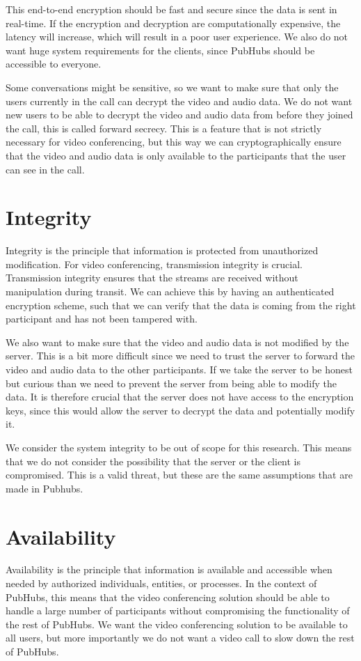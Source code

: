 \documentclass{report}
\begin{document}
This end-to-end encryption should be fast and secure since the data is sent in real-time. If the encryption and
decryption are computationally expensive, the latency will increase, which will result in a poor user experience. We
also do not want huge system requirements for the clients, since PubHubs should be accessible to everyone.

Some conversations might be sensitive, so we want to make sure that only the users currently in the call can
decrypt the video and audio data. We do not want new users to be able to decrypt the video and audio data from
before they joined the call, this is called forward secrecy. This is a feature that is not strictly necessary for
video conferencing, but this way we can cryptographically ensure that the video and audio data is only available to
the participants that the user can see in the call.

\section{Integrity}
Integrity is the principle that information is protected from unauthorized modification. For video conferencing, transmission integrity
is crucial. Transmission integrity ensures that the streams are received without manipulation during transit.
We can achieve this by having an authenticated encryption scheme, such that we can verify that the data is coming from
the right participant and has not been tampered with.

We also want to make sure that the video and audio data is not modified by the server. This is a bit more difficult
since we need to trust the server to forward the video and audio data to the other participants. If we take the server
to be honest but curious than we need to prevent the server from being able to modify the data. It is therefore crucial
that the server does not have access to the encryption keys, since this would allow the server to decrypt the data and
potentially modify it.

We consider the system integrity to be out of scope for this research. This means that we do not consider the
possibility that the server or the client is compromised. This is a valid threat, but these are the same assumptions
that are made in Pubhubs.

\section{Availability}
Availability is the principle that information is available and accessible when needed by authorized individuals,
entities, or processes. In the context of PubHubs, this means that the video conferencing solution should be able to
handle a large number of participants without compromising the functionality of the rest of PubHubs. We want the
video conferencing solution to be available to all users, but more importantly we do not want a video call to slow
down the rest of PubHubs.
\end{document}

